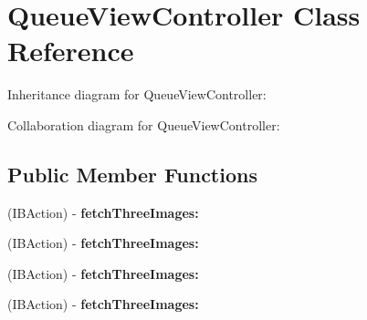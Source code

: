 \hypertarget{interface_queue_view_controller}{
\section{\-Queue\-View\-Controller \-Class \-Reference}
\label{interface_queue_view_controller}
}


\-Inheritance diagram for \-Queue\-View\-Controller\-:


\-Collaboration diagram for \-Queue\-View\-Controller\-:
\subsection*{\-Public \-Member \-Functions}
\begin{DoxyCompactItemize}
\item 
\hypertarget{interface_queue_view_controller_a4375888d3ff0461abffebea5c04faaf7}{
(\-I\-B\-Action) -\/ {\bfseries fetch\-Three\-Images\-:}}
\label{interface_queue_view_controller_a4375888d3ff0461abffebea5c04faaf7}

\item 
\hypertarget{interface_queue_view_controller_a4375888d3ff0461abffebea5c04faaf7}{
(\-I\-B\-Action) -\/ {\bfseries fetch\-Three\-Images\-:}}
\label{interface_queue_view_controller_a4375888d3ff0461abffebea5c04faaf7}

\item 
\hypertarget{interface_queue_view_controller_a4375888d3ff0461abffebea5c04faaf7}{
(\-I\-B\-Action) -\/ {\bfseries fetch\-Three\-Images\-:}}
\label{interface_queue_view_controller_a4375888d3ff0461abffebea5c04faaf7}

\item 
\hypertarget{interface_queue_view_controller_a4375888d3ff0461abffebea5c04faaf7}{
(\-I\-B\-Action) -\/ {\bfseries fetch\-Three\-Images\-:}}
\label{interface_queue_view_controller_a4375888d3ff0461abffebea5c04faaf7}

\end{DoxyCompactItemize}
